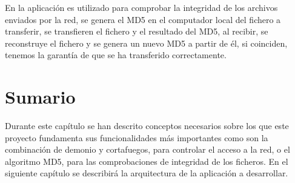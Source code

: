 En la aplicación es utilizado para comprobar la integridad de los archivos enviados por la red, se genera el MD5 en el computador local del fichero a transferir, se transfieren el fichero y el resultado del MD5, al recibir, se reconstruye el fichero y se genera un nuevo MD5 a partir de él, si coinciden, tenemos la garantía de que se ha transferido correctamente.

\section{Sumario}

Durante este capítulo se han descrito conceptos necesarios sobre los que este proyecto fundamenta sus funcionalidades más importantes como son la combinación de demonio y cortafuegos, para controlar el acceso a la red, o el algoritmo MD5, para las comprobaciones de integridad de los ficheros. En el siguiente capítulo se describirá la arquitectura de la aplicación a desarrollar.
